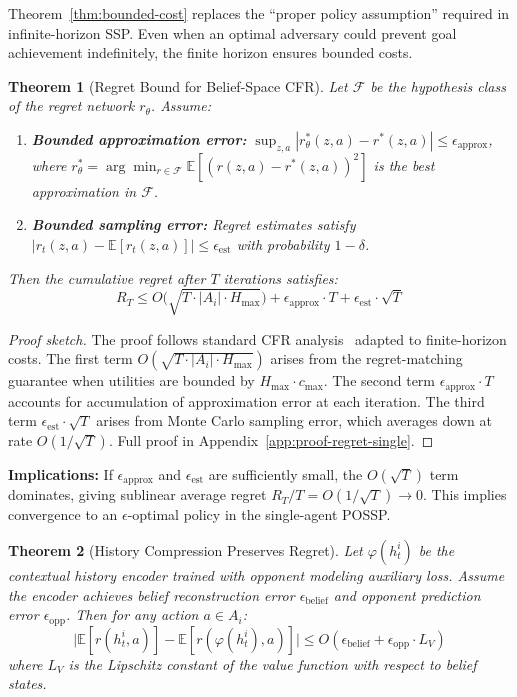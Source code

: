 \documentclass{article}
\newtheorem{theorem}{Theorem}[section]
\begin{document}
Theorem~\ref{thm:bounded-cost} replaces the ``proper policy assumption'' required in infinite-horizon SSP. Even when an optimal adversary could prevent goal achievement indefinitely, the finite horizon ensures bounded costs.

\begin{theorem}[Regret Bound for Belief-Space CFR]
\label{thm:regret-single}
Let $\mathcal{F}$ be the hypothesis class of the regret network $r_\theta$. Assume:
\begin{enumerate}
    \item \textbf{Bounded approximation error:} $\sup_{z,a} |r_\theta^*(z,a) - r^*(z,a)| \leq \epsilon_{\text{approx}}$, where $r_\theta^* = \arg\min_{r \in \mathcal{F}} \mathbb{E}[(r(z,a) - r^*(z,a))^2]$ is the best approximation in $\mathcal{F}$.
    \item \textbf{Bounded sampling error:} Regret estimates satisfy $|r_t(z,a) - \mathbb{E}[r_t(z,a)]| \leq \epsilon_{\text{est}}$ with probability $1 - \delta$.
\end{enumerate}
Then the cumulative regret after $T$ iterations satisfies:
\begin{equation}
R_T \leq O\big(\sqrt{T \cdot |A_i| \cdot H_{\max}}\big) + \epsilon_{\text{approx}} \cdot T + \epsilon_{\text{est}} \cdot \sqrt{T}
\end{equation}
\end{theorem}

\begin{proof}[Proof sketch]
The proof follows standard CFR analysis~\cite{zinkevich2007regret} adapted to finite-horizon costs. The first term $O(\sqrt{T \cdot |A_i| \cdot H_{\max}})$ arises from the regret-matching guarantee when utilities are bounded by $H_{\max} \cdot c_{\max}$. The second term $\epsilon_{\text{approx}} \cdot T$ accounts for accumulation of approximation error at each iteration. The third term $\epsilon_{\text{est}} \cdot \sqrt{T}$ arises from Monte Carlo sampling error, which averages down at rate $O(1/\sqrt{T})$. Full proof in Appendix~\ref{app:proof-regret-single}.
\end{proof}

\textbf{Implications:} If $\epsilon_{\text{approx}}$ and $\epsilon_{\text{est}}$ are sufficiently small, the $O(\sqrt{T})$ term dominates, giving sublinear average regret $R_T / T = O(1/\sqrt{T}) \to 0$. This implies convergence to an $\epsilon$-optimal policy in the single-agent POSSP.

\begin{theorem}[History Compression Preserves Regret]
\label{thm:sufficient-statistic}
Let $\varphi(h_t^i)$ be the contextual history encoder trained with opponent modeling auxiliary loss. Assume the encoder achieves belief reconstruction error $\epsilon_{\text{belief}}$ and opponent prediction error $\epsilon_{\text{opp}}$. Then for any action $a \in A_i$:
\begin{equation}
\big|\mathbb{E}[r(h_t^i, a)] - \mathbb{E}[r(\varphi(h_t^i), a)]\big| \leq O(\epsilon_{\text{belief}} + \epsilon_{\text{opp}} \cdot L_V)
\end{equation}
where $L_V$ is the Lipschitz constant of the value function with respect to belief states.
\end{theorem}
\end{document}
